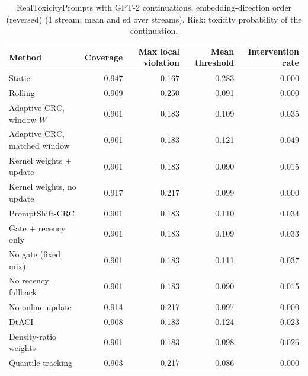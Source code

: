 \begin{table}[H]
\centering
\small
\caption{RealToxicityPrompts with GPT-2 continuations, embedding-direction order (reversed) (1 stream; mean and sd over streams). Risk: toxicity probability of the continuation.}
\label{tab:rtp_pc1_reverse}
\begin{tabular}{lrrrr}
\toprule
Method & Coverage & Max local violation & Mean threshold & Intervention rate \\
\midrule
Static & 0.947 & 0.167 & 0.283 & 0.000 \\
Rolling & 0.909 & 0.250 & 0.091 & 0.000 \\
Adaptive CRC, window $W$ & 0.901 & 0.183 & 0.109 & 0.035 \\
Adaptive CRC, matched window & 0.901 & 0.183 & 0.121 & 0.049 \\
Kernel weights + update & 0.901 & 0.183 & 0.090 & 0.015 \\
Kernel weights, no update & 0.917 & 0.217 & 0.099 & 0.000 \\
PromptShift-CRC & 0.901 & 0.183 & 0.110 & 0.034 \\
Gate + recency only & 0.901 & 0.183 & 0.109 & 0.033 \\
No gate (fixed mix) & 0.901 & 0.183 & 0.111 & 0.037 \\
No recency fallback & 0.901 & 0.183 & 0.090 & 0.015 \\
No online update & 0.914 & 0.217 & 0.097 & 0.000 \\
DtACI & 0.908 & 0.183 & 0.124 & 0.023 \\
Density-ratio weights & 0.901 & 0.183 & 0.098 & 0.026 \\
Quantile tracking & 0.903 & 0.217 & 0.086 & 0.000 \\
\bottomrule
\end{tabular}
\end{table}

